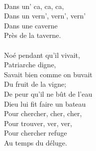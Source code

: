 {\\Dans un' ca, ca, ca,
\\Dans un vern', vern', vern'
\\Dans une caverne
\\Près de la taverne.
\\\\Noé pendant qu'il vivait,
\\Patriarche digne,
\\Savait bien comme on buvait
\\Du fruit de la vigne;
\\De peur qu'il ne bût de l'eau
\\Dieu lui fit faire un bateau
\\Pour chercher, cher, cher,
\\Pour trouver, ver, ver,
\\Pour chercher refuge
\\Au temps du déluge.
}
\breakpage